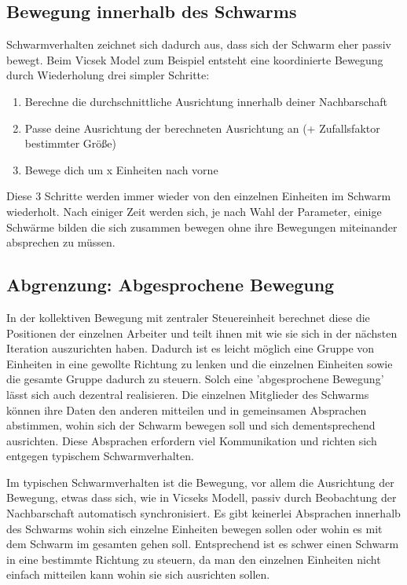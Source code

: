 \subsection{Bewegung innerhalb des Schwarms}\label{subsec:BewegungImSchwarm}

Schwarmverhalten zeichnet sich dadurch aus, dass sich der Schwarm eher passiv bewegt.
Beim Vicsek Model 
zum Beispiel entsteht eine koordinierte Bewegung durch Wiederholung drei simpler Schritte:

\begin{enumerate}
	\item Berechne die durchschnittliche Ausrichtung innerhalb deiner Nachbarschaft
	\item Passe deine Ausrichtung der berechneten Ausrichtung an (+ Zufallsfaktor bestimmter Größe)
	\item Bewege dich um x Einheiten nach vorne
\end{enumerate}

Diese 3 Schritte werden immer wieder von den einzelnen Einheiten im Schwarm wiederholt. Nach einiger Zeit werden sich, je nach Wahl der Parameter, einige Schwärme bilden die sich zusammen bewegen ohne ihre Bewegungen miteinander absprechen zu müssen.

\subsection{Abgrenzung: Abgesprochene Bewegung}\label{subsec:AbgesprocheneBewegung}

In der kollektiven Bewegung mit zentraler Steuereinheit berechnet diese die Positionen der einzelnen Arbeiter und teilt ihnen mit wie sie sich in der nächsten Iteration auszurichten haben.
Dadurch ist es leicht möglich eine Gruppe von Einheiten in eine gewollte Richtung zu lenken und die einzelnen Einheiten sowie die gesamte Gruppe dadurch zu steuern.
Solch eine 'abgesprochene Bewegung' lässt sich auch dezentral realisieren.
Die einzelnen Mitglieder des Schwarms können ihre Daten den anderen mitteilen und in gemeinsamen Absprachen abstimmen, wohin sich der Schwarm bewegen soll und sich dementsprechend ausrichten.
Diese Absprachen erfordern viel Kommunikation und richten sich entgegen typischem Schwarmverhalten.

Im typischen Schwarmverhalten ist die Bewegung, vor allem die Ausrichtung der Bewegung, etwas dass sich, wie in Vicseks Modell, passiv durch Beobachtung der Nachbarschaft automatisch synchronisiert.
Es gibt keinerlei Absprachen innerhalb des Schwarms wohin sich einzelne Einheiten bewegen sollen oder wohin es mit dem Schwarm im gesamten gehen soll.
Entsprechend ist es schwer einen Schwarm in eine bestimmte Richtung zu steuern, da man den einzelnen Einheiten nicht einfach mitteilen kann wohin sie sich ausrichten sollen.

